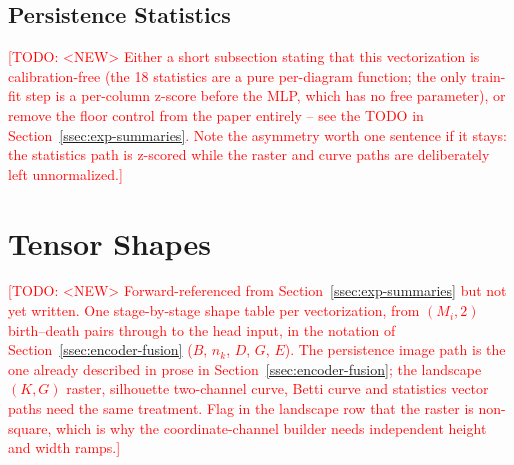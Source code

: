 \documentclass[11pt,letterpaper]{article}
\newcommand{\1}{\mathds{1}}
\newcommand{\todo}[1]{\textcolor{red}{[TODO: #1]}}
\newcommand{\fix}[1]{\textcolor{blue}{[FIX: #1]}}
\newcommand{\todo}[1]{}\newcommand{\fix}[1]{}
\theoremstyle{plain}
\theoremstyle{definitioncolon}
\begin{document}
\subsection{Persistence Statistics}
\label{app:calib-stat}

\todo{<NEW> Either a short subsection stating that this vectorization is
calibration-free (the 18 statistics are a pure per-diagram function; the only
train-fit step is a per-column z-score before the MLP, which has no free
parameter), or remove the floor control from the paper entirely -- see the TODO
in Section~\ref{ssec:exp-summaries}. Note the asymmetry worth one sentence if it
stays: the statistics path is z-scored while the raster and curve paths are
deliberately left unnormalized.}


\section{Tensor Shapes}
\label{app:tensor-shapes}

\todo{<NEW> Forward-referenced from Section~\ref{ssec:exp-summaries} but not yet
written. One stage-by-stage shape table per vectorization, from
$(M_i, 2)$ birth--death pairs through to the head input, in the notation of
Section~\ref{ssec:encoder-fusion} ($B$, $n_k$, $D$, $G$, $E$). The persistence
image path is the one already described in prose in
Section~\ref{ssec:encoder-fusion}; the landscape $(K,G)$ raster, silhouette
two-channel curve, Betti curve and statistics vector paths need the same
treatment. Flag in the landscape row that the raster is non-square, which is why
the coordinate-channel builder needs independent height and width ramps.}
\end{document}
